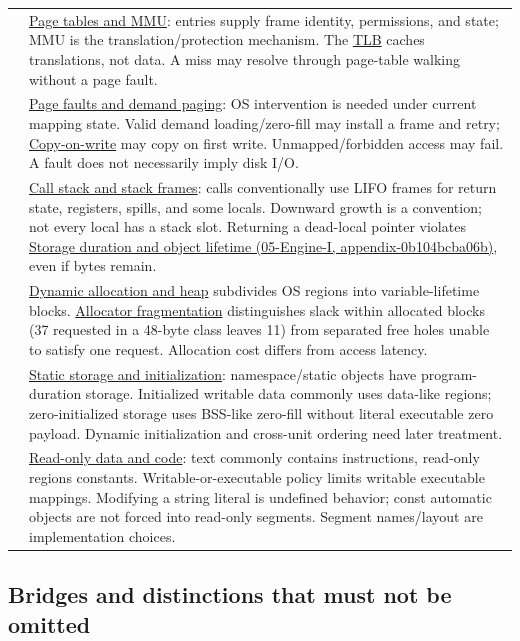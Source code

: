 {\begin{longtable}[]{@{}
  >{\raggedright\arraybackslash}p{}
  >{\raggedright\arraybackslash}p{}@{}}
55 & \hyperref[appendix-01e5905165c4]{Page tables and MMU}: entries supply frame identity, permissions, and state; MMU is the translation/protection mechanism. The \hyperref[appendix-7a2d9c5ce511]{TLB} caches translations, not data. A miss may resolve through page-table walking without a page fault. \\
56 & \hyperref[appendix-cc0909a7ef14]{Page faults and demand paging}: OS intervention is needed under current mapping state. Valid demand loading/zero-fill may install a frame and retry; \hyperref[appendix-7a06e5baac04]{Copy-on-write} may copy on first write. Unmapped/forbidden access may fail. A fault does not necessarily imply disk I/O. \\
57 & \hyperref[appendix-b081b7abe193]{Call stack and stack frames}: calls conventionally use LIFO frames for return state, registers, spills, and some locals. Downward growth is a convention; not every local has a stack slot. Returning a dead-local pointer violates \href{../05-Engine-I/main.pdf\#nameddest=appendix-0b104bcba06b}{Storage duration and object lifetime (05-Engine-I, appendix-0b104bcba06b)}, even if bytes remain. \\
58 & \hyperref[appendix-c3480f7d9ff3]{Dynamic allocation and heap} subdivides OS regions into variable-lifetime blocks. \hyperref[appendix-a7c50686d81f]{Allocator fragmentation} distinguishes slack within allocated blocks (37 requested in a 48-byte class leaves 11) from separated free holes unable to satisfy one request. Allocation cost differs from access latency. \\
59 & \hyperref[appendix-17c93c4c2f19]{Static storage and initialization}: namespace/static objects have program-duration storage. Initialized writable data commonly uses data-like regions; zero-initialized storage uses BSS-like zero-fill without literal executable zero payload. Dynamic initialization and cross-unit ordering need later treatment. \\
60 & \hyperref[appendix-5f9e5e2f0a5e]{Read-only data and code}: text commonly contains instructions, read-only regions constants. Writable-or-executable policy limits writable executable mappings. Modifying a string literal is undefined behavior; const automatic objects are not forced into read-only segments. Segment names/layout are implementation choices. \\
\end{longtable}
}

\subsection{Bridges and distinctions that must not be omitted}\label{appendix-fd090d982a15-bridges-and-distinctions-that-must-not-be-omitted}

